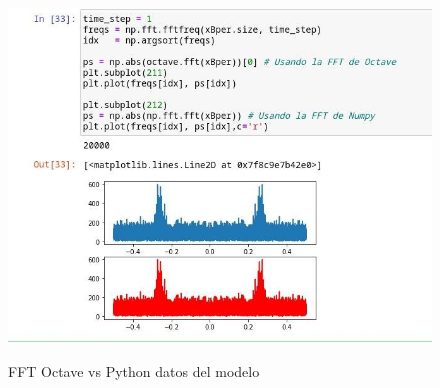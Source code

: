 \documentclass[12pt]{article}
\begin{document}
\begin{refsegment}

    \begin{figure}[H]
        \centering
        \caption{FFT Octave vs Python datos del modelo}
            \includegraphics[width=16cm]{comprobacion_resultados/finales/comFFT2.png}
        \label{img:FFTSensores}
    \end{figure}
    \endgroup


    


\end{refsegment}
\end{document}
